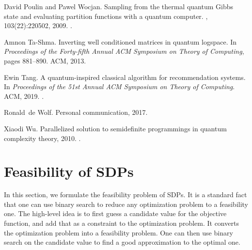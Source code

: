 \documentclass[a4paper,UKenglish,cleveref, autoref]{lipics-v2019}
\theoremstyle{remark}
\numberwithin{equation}{section}
\numberwithin{oracle}{section}
\numberwithin{remark}{section}
\begin{document}
\begin{thebibliography}{10}
David Poulin and Pawel Wocjan.
\newblock Sampling from the thermal quantum {G}ibbs state and evaluating
  partition functions with a quantum computer.
, 103(22):220502, 2009.
\newblock \href {http://arxiv.org/abs/0905.2199} {}.

Amnon Ta-Shma.
\newblock Inverting well conditioned matrices in quantum logspace.
\newblock In {\em Proceedings of the Forty-fifth Annual ACM Symposium on Theory
  of Computing}, pages 881--890. ACM, 2013.

Ewin Tang.
\newblock A quantum-inspired classical algorithm for recommendation systems.
\newblock In {\em Proceedings of the 51st Annual ACM Symposium on Theory of
  Computing}. ACM, 2019.
\newblock \href {http://arxiv.org/abs/1807.04271} {}.

Ronald~de Wolf.
\newblock Personal communication, 2017.

Xiaodi Wu.
\newblock Parallelized solution to semidefinite programmings in quantum
  complexity theory, 2010.
\newblock \href {http://arxiv.org/abs/1009.2211} {}.

\end{thebibliography}


\appendix

\section{Feasibility of SDPs} \label{append:SDP}
In this section, we formulate the feasibility problem of SDPs. It is a standard fact that one can use binary search to reduce any optimization problem to a feasibility one.
The high-level idea is to first guess a candidate value for the objective function, and add that as a constraint to the optimization problem. It converts the optimization problem into a feasibility problem.
One can then use binary search on the candidate value to find a good approximation to the optimal one.
\end{document}
